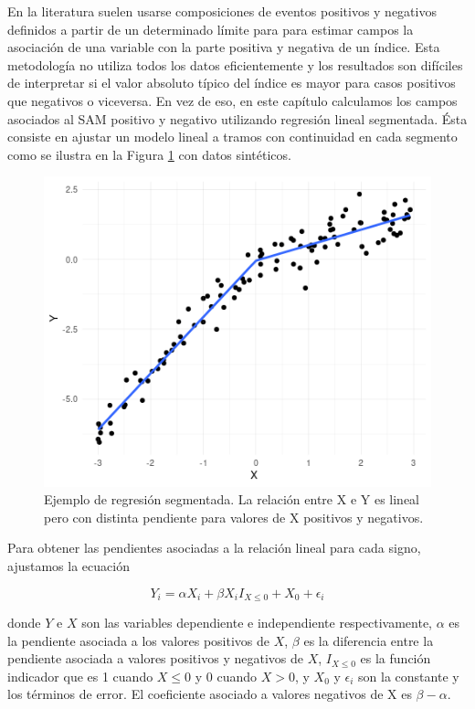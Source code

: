 \documentclass[12pt,oneside]{reedthesis}
\begin{document}
En la literatura suelen usarse composiciones de eventos positivos y negativos definidos a partir de un determinado límite para para estimar campos la asociación de una variable con la parte positiva y negativa de un índice.
Esta metodología no utiliza todos los datos eficientemente y los resultados son difíciles de interpretar si el valor absoluto típico del índice es mayor para casos positivos que negativos o viceversa.
En vez de eso, en este capítulo calculamos los campos asociados al SAM positivo y negativo utilizando regresión lineal segmentada.
Ésta consiste en ajustar un modelo lineal a tramos con continuidad en cada segmento como se ilustra en la Figura \ref{fig:segmentada-ejemplo} con datos sintéticos.

\begin{figure}
\includegraphics{figures/30-sam/segmentada-ejemplo-1} \caption{Ejemplo de regresión segmentada. La relación entre X e Y es lineal pero con distinta pendiente para valores de X positivos y negativos.}\label{fig:segmentada-ejemplo}
\end{figure}



Para obtener las pendientes asociadas a la relación lineal para cada signo, ajustamos la ecuación

\[
Y_i = \alpha X_i + \beta X_iI_{X\le 0} + X_0 + \epsilon_i
\]

donde \(Y\) e \(X\) son las variables dependiente e independiente respectivamente, \(\alpha\) es la pendiente asociada a los valores positivos de \(X\), \(\beta\) es la diferencia entre la pendiente asociada a valores positivos y negativos de \(X\), \(I_{X\le 0}\) es la función indicador que es 1 cuando \(X\le0\) y 0 cuando \(X>0\), y \(X_0\) y \(\epsilon_i\) son la constante y los términos de error.
El coeficiente asociado a valores negativos de X es \(\beta - \alpha\).
\end{document}
